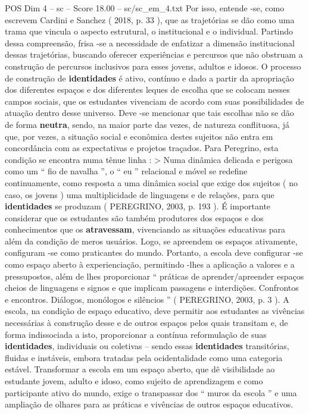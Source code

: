 \begin{textsample}{POS Dim 4 – sc – Score 18.00 – sc/sc\_em\_4.txt}
Por isso, entende -se, como escrevem Cardini e Sanchez ( 2018, p. 33 ), que as trajetórias se dão como uma trama que vincula o aspecto estrutural, o institucional e o individual.
Partindo dessa compreensão, frisa -se a necessidade de enfatizar a dimensão institucional dessas trajetórias, buscando oferecer experiências e percursos que não obstruam a construção de percursos inclusivos para esses jovens, adultos e idosos.
O processo de construção de \textbf{identidades} é ativo, contínuo e dado a partir da apropriação dos diferentes espaços e dos diferentes leques de escolha que se colocam nesses campos sociais, que os estudantes vivenciam de acordo com suas possibilidades de atuação dentro desse universo.
Deve -se mencionar que tais escolhas não se dão de forma \textbf{neutra}, sendo, na maior parte das vezes, de natureza conflituosa, já que, por vezes, a situação social e econômica destes sujeitos não entra em concordância com as expectativas e projetos traçados.
Para Peregrino, esta condição se encontra numa tênue linha : > Numa dinâmica delicada e perigosa como um “ fio de navalha ”, o “ eu ” relacional e móvel se redefine continuamente, como resposta a uma dinâmica social que exige dos sujeitos ( no caso, os jovens ) uma multiplicidade de linguagens e de relações, para que \textbf{identidades} se produzam ( PEREGRINO, 2003, p. 193 ).
É importante considerar que os estudantes são também produtores dos espaços e dos conhecimentos que os \textbf{atravessam}, vivenciando as situações educativas para além da condição de meros usuários.
Logo, se apreendem os espaços ativamente, configuram -se como praticantes do mundo.
Portanto, a escola deve configurar -se como espaço aberto à experienciação, permitindo -lhes a aplicação a valores e a pressupostos, além de lhes proporcionar “ práticas de aprender/apreender espaços cheios de linguagens e signos e que implicam passagens e interdições.
Confrontos e encontros.
Diálogos, monólogos e silêncios ” ( PEREGRINO, 2003, p. 3 ).
A escola, na condição de espaço educativo, deve permitir aos estudantes as vivências necessárias à construção desse e de outros espaços pelos quais transitam e, de forma indissociada a isto, proporcionar a contínua reformulação de suas \textbf{identidades}, individuais ou coletivas – sendo essas \textbf{identidades} transitórias, fluidas e instáveis, embora tratadas pela ocidentalidade como uma categoria estável.
Transformar a escola em um espaço aberto, que dê visibilidade ao estudante jovem, adulto e idoso, como sujeito de aprendizagem e como participante ativo do mundo, exige o transpassar dos “ muros da escola ” e uma ampliação de olhares para as práticas e vivências de outros espaços educativos.

\end{textsample}
